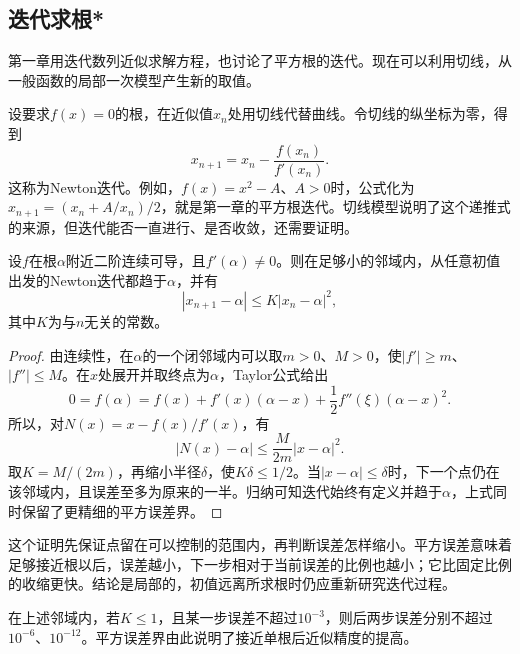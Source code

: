 \subsection{迭代求根*}
\label{subsec:calculus-newton-iteration}

第一章用迭代数列近似求解方程，也讨论了平方根的迭代。现在可以利用切线，从一般函数的局部一次模型产生新的取值。

设要求\(f(x)=0\)的根，在近似值\(x_n\)处用切线代替曲线。令切线的纵坐标为零，得到
\begin{equation}\label{eq:calculus-newton-iteration}
 x_{n+1}=x_n-\frac{f(x_n)}{f'(x_n)}.
\end{equation}
这称为{\heiti{}Newton迭代}。例如，\(f(x)=x^2-A\)、\(A>0\)时，公式化为\(x_{n+1}=(x_n+A/x_n)/2\)，就是第一章的平方根迭代。切线模型说明了这个递推式的来源，但迭代能否一直进行、是否收敛，还需要证明。

\begin{proposition}\label{prop:calculus-newton-error}
设\(f\)在根\(\alpha\)附近二阶连续可导，且\(f'(\alpha)\ne0\)。则在足够小的邻域内，从任意初值出发的Newton迭代都趋于\(\alpha\)，并有
\begin{equation*}
 |x_{n+1}-\alpha|\le K|x_n-\alpha|^2,
\end{equation*}
其中\(K\)为与\(n\)无关的常数。
\end{proposition}

\begin{proof}
由连续性，在\(\alpha\)的一个闭邻域内可以取\(m>0\)、\(M>0\)，使\(|f'|\ge m\)、\(|f''|\le M\)。在\(x\)处展开并取终点为\(\alpha\)，Taylor公式给出
\begin{equation*}
 0=f(\alpha)=f(x)+f'(x)(\alpha-x)+\frac12f''(\xi)(\alpha-x)^2.
\end{equation*}
所以，对\(N(x)=x-f(x)/f'(x)\)，有
\begin{equation*}
 |N(x)-\alpha|\le\frac M{2m}|x-\alpha|^2.
\end{equation*}
取\(K=M/(2m)\)，再缩小半径\(\delta\)，使\(K\delta\le1/2\)。当\(|x-\alpha|\le\delta\)时，下一个点仍在该邻域内，且误差至多为原来的一半。归纳可知迭代始终有定义并趋于\(\alpha\)，上式同时保留了更精细的平方误差界。
\end{proof}

这个证明先保证点留在可以控制的范围内，再判断误差怎样缩小。平方误差意味着足够接近根以后，误差越小，下一步相对于当前误差的比例也越小；它比固定比例的收缩更快。结论是局部的，初值远离所求根时仍应重新研究迭代过程。

在上述邻域内，若\(K\le1\)，且某一步误差不超过\(10^{-3}\)，则后两步误差分别不超过\(10^{-6}\)、\(10^{-12}\)。平方误差界由此说明了接近单根后近似精度的提高。

